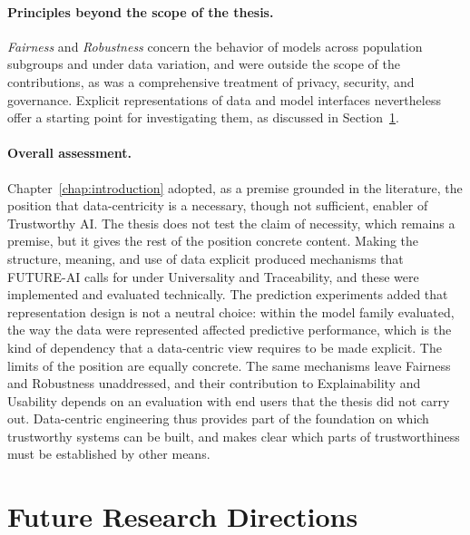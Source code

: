 \paragraph{Principles beyond the scope of the thesis.}
\emph{Fairness} and \emph{Robustness} concern the behavior of models across population subgroups and under data variation, and were outside the scope of the contributions, as was a comprehensive treatment of privacy, security, and governance. Explicit representations of data and model interfaces nevertheless offer a starting point for investigating them, as discussed in Section~\ref{sec:conclusions_future}.

\paragraph{Overall assessment.}
Chapter~\ref{chap:introduction} adopted, as a premise grounded in the literature, the position that data-centricity is a necessary, though not sufficient, enabler of Trustworthy AI. The thesis does not test the claim of necessity, which remains a premise, but it gives the rest of the position concrete content. Making the structure, meaning, and use of data explicit produced mechanisms that FUTURE-AI calls for under Universality and Traceability, and these were implemented and evaluated technically. The prediction experiments added that representation design is not a neutral choice: within the model family evaluated, the way the data were represented affected predictive performance, which is the kind of dependency that a data-centric view requires to be made explicit. The limits of the position are equally concrete. The same mechanisms leave Fairness and Robustness unaddressed, and their contribution to Explainability and Usability depends on an evaluation with end users that the thesis did not carry out. Data-centric engineering thus provides part of the foundation on which trustworthy systems can be built, and makes clear which parts of trustworthiness must be established by other means.

\section{Future Research Directions}
\label{sec:conclusions_future}

